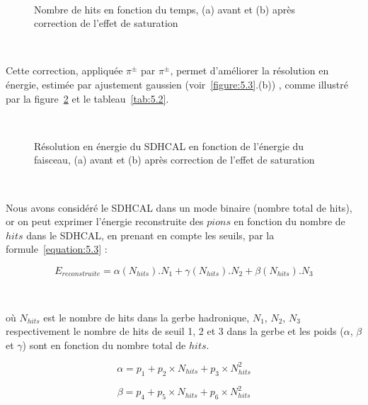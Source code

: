  \begin{figure}[H]
  \centering 
  \mbox{ }
  \caption{Nombre de hits en fonction du temps, (a) avant et (b) apr\`es correction de l'effet de saturation} 
  \label{figure:5.4}
\end{figure}

~\par Cette correction, appliqu\'ee $\pi^{\pm}$ par $\pi^{\pm}$, permet d'am\'eliorer la r\'esolution en \'energie, estimée par ajustement gaussien (voir~\ref{figure:5.3}.(b)) , comme illustr\'e par la figure~\ref{figure:5.5} et le tableau~\ref{tab:5.2}.

 \begin{figure}[H]
  \centering 
  \mbox{ }
  \caption{R\'esolution en \'energie du SDHCAL en fonction de l'\'energie du faisceau, (a) avant et (b) apr\`es correction de l'effet de saturation} 
  \label{figure:5.5}
\end{figure}

~\par Nous avons considéré le SDHCAL dans un mode binaire (nombre total de hits), or on peut exprimer l'\'energie reconstruite des $pions$ en fonction du nombre de $hits$ dans le SDHCAL, en prenant en compte les seuils, par la formule~\eqref{equation:5.3} : 

\begin{equation}
E_{reconstruite}=\alpha(N_{hits}).N_{1}+\gamma(N_{hits}).N_{2}+\beta(N_{hits}).N_{3}
\label{equation:5.3}
\end{equation}

~\par o\`u $N_{hits}$ est le nombre de hits dans la gerbe hadronique, $N_{1}$, $N_{2}$, $N_{3}$ respectivement le nombre de hits de seuil 1, 2 et 3 dans la gerbe et les poids ($\alpha$, $\beta$ et $\gamma$) sont en fonction du nombre total de $hits$.

\begin{equation}
\alpha=p_{1}+p_{2}{\times}N_{hits}+p_{3}{\times}N_{hits}^{2}
\label{equation:5.4}
\end{equation}

\begin{equation}
\beta=p_{4}+p_{5}{\times}N_{hits}+p_{6}{\times}N_{hits}^{2}
\label{equation:5.5}
\end{equation}

